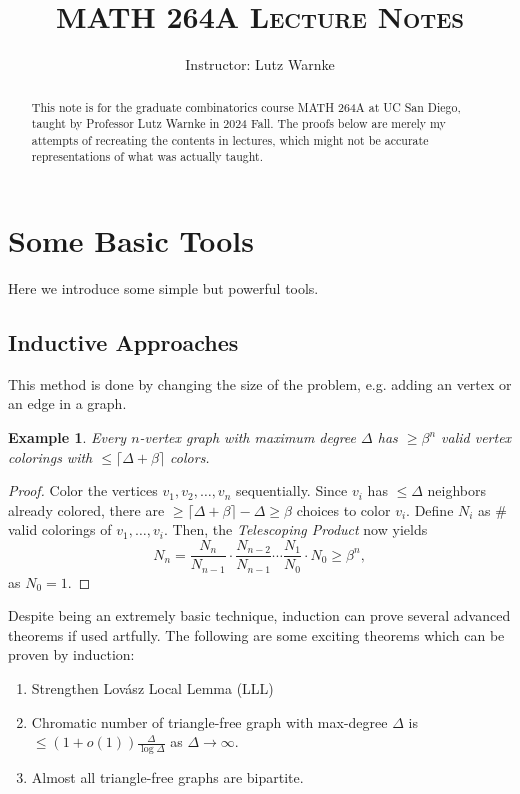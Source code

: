 \documentclass[a4paper]{article}
\title{\textsc{MATH 264A Lecture Notes}}
\author{Instructor: Lutz Warnke}
\date{}
\newtheorem{example}[theorem]{Example}
\begin{document}
\maketitle

\begin{abstract}
  This note is for the graduate combinatorics course MATH 264A at UC San Diego, taught by Professor
  Lutz Warnke in 2024 Fall. The proofs below are merely my attempts of recreating the contents in
  lectures, which might not be accurate representations of what was actually taught. 
\end{abstract}

\section*{Some Basic Tools}

Here we introduce some simple but powerful tools.

\subsection*{Inductive Approaches}

This method is done by changing the size of the problem, e.g. adding an vertex or an edge in a
graph.

\begin{example}
  Every $n$-vertex graph with maximum degree $\Delta$ has $\geq \beta^n$ valid vertex colorings with
  $\leq \lceil \Delta + \beta \rceil$ colors.
\end{example}

\begin{proof}
  Color the vertices $v_1, v_2, \ldots, v_n$ sequentially. Since $v_i$ has $\leq \Delta$ neighbors
  already colored, there are $\geq \lceil \Delta + \beta \rceil - \Delta \geq \beta$ choices to
  color $v_i$. Define $N_i$ as $\#$ valid colorings of $v_1, \ldots, v_i$. Then, the
  \textit{Telescoping Product} now yields
  \[
    N_n = \frac{N_n}{N_{n - 1}} \cdot \frac{N_{n - 2}}{N_{n - 1}} \cdots \frac{N_{1}}{N_{0}} \cdot N_0 \geq \beta^n,
  \]
  as $N_0 = 1$.
\end{proof}

Despite being an extremely basic technique, induction can prove several advanced theorems if used
artfully. The following are some exciting theorems which can be proven by induction:

\begin{enumerate}
  \item Strengthen Lovász Local Lemma (LLL)
  \item Chromatic number of triangle-free graph with max-degree $\Delta$ is $\leq (1 +
  o(1))\frac{\Delta}{\log \Delta}$ as $\Delta \to \infty$.
  \item Almost all triangle-free graphs are bipartite.
\end{enumerate}
\end{document}
